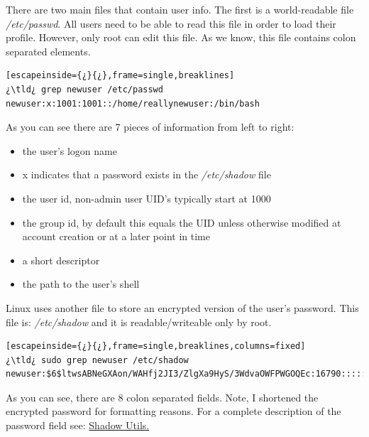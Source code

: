 There are two main files that contain user info. The first is a world-readable file \textsl{/etc/passwd}. All users need to be able to read this file in order to load their profile. However, only root can edit this file. As we know, this file contains colon separated elements.

\begin{lstlisting}[escapeinside={¿}{¿},frame=single,breaklines]
¿\tld¿ grep newuser /etc/passwd
newuser:x:1001:1001::/home/reallynewuser:/bin/bash
\end{lstlisting}

As you can see there are 7 pieces of information from left to right:
\begin{itemize}
	\item {} the user's logon name
		\item {} x indicates that a password exists in the \textsl{/etc/shadow} file
	\item {} the user id, non-admin user UID's typically start at 1000
	\item {} the group id, by default this equals the UID unless otherwise modified at account creation or at a later point in time
	\item {} a short descriptor
	\item {} the path to the user's shell
\end{itemize}

Linux uses another file to store an encrypted version of the user's password. This file is: \textsl{/etc/shadow} and it is readable/writeable only by root.

\begin{lstlisting}[escapeinside={¿}{¿},frame=single,breaklines,columns=fixed]
¿\tld¿ sudo grep newuser /etc/shadow 
newuser:$6$ltwsABNeGXAon/WAHfj2JI3/ZlgXa9HyS/3WdvaOWFPWGOQEc:16790::::::
\end{lstlisting}

As you can see, there are 8 colon separated fields. Note, I shortened the encrypted password for formatting reasons. For a complete description of the password field see: \href{http://www.slashroot.in/how-are-passwords-stored-linux-understanding-hashing-shadow-utils}{Shadow Utils.}

